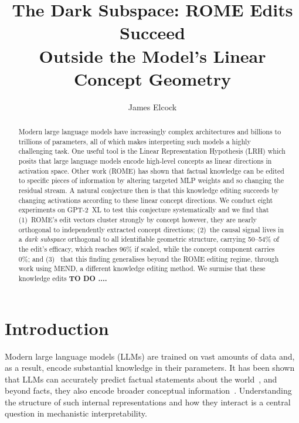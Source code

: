 \documentclass[11pt,a4paper]{article}
\title{The Dark Subspace: ROME Edits Succeed\\Outside the Model's Linear Concept Geometry}
\author{
  James Elcock
}
\date{}
\begin{document}
\maketitle

\begin{abstract}

Modern large language models have increasingly complex architectures and billions to trillions of parameters, all of which makes interpreting such models a highly challenging task. One useful tool is the Linear Representation Hypothesis (LRH) which posits that large language models encode high-level concepts as linear directions in activation space. Other work (ROME) has shown that factual knowledge can be edited to specific pieces of information by altering targeted MLP weights and so changing the residual stream. A natural conjecture then is that this knowledge editing succeeds by changing activations according to these linear concept directions. We conduct eight experiments on GPT-2~XL to test this conjecture systematically and 
we find that (1)~ROME's edit vectors cluster strongly by concept however, they are nearly orthogonal to independently extracted concept directions; (2)~the causal signal lives in a \emph{dark subspace} orthogonal to all identifiable geometric structure, carrying 50--54\% of the edit's efficacy, which reaches 96\% if scaled, while the concept component carries 0\%; and (3)~ that this finding generalises beyond the ROME editing regime, through work using MEND, a different knowledge editing method. We surmise that these knowledge edits \textbf{TO DO ....}

\end{abstract}

\section{Introduction}
\label{sec:intro}
Modern large language models (LLMs) are trained on vast amounts of data and, as a result, encode substantial knowledge in their parameters. It has been shown that LLMs can accurately predict factual statements about the world~\citep{petroni2019language,adelani2021masakhaner,roberts2020much}, and beyond facts, they also encode broader conceptual information~\citep{gurnee2023language,lrhorig}. Understanding the structure of such internal representations and how they interact is a central question in mechanistic interpretability.
\end{document}
